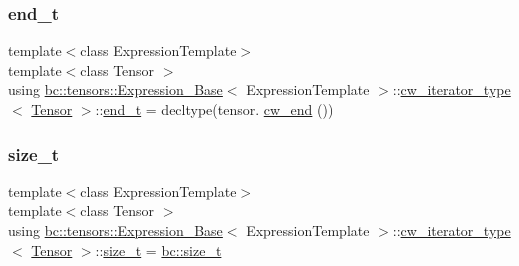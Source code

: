 \mbox{\label{structbc_1_1tensors_1_1Expression__Base_1_1cw__iterator__type_aa4dec4d7233266282d8243b49a101174}} 
\subsubsection{\texorpdfstring{end\+\_\+t}{end\_t}}
{\footnotesize\ttfamily template$<$class Expression\+Template$>$ \\
template$<$class Tensor $>$ \\
using \hyperlink{classbc_1_1tensors_1_1Expression__Base}{bc\+::tensors\+::\+Expression\+\_\+\+Base}$<$ Expression\+Template $>$\+::\hyperlink{structbc_1_1tensors_1_1Expression__Base_1_1cw__iterator__type}{cw\+\_\+iterator\+\_\+type}$<$ \hyperlink{namespacebc_a659391e47ab612be3ba6c18cf9c89159}{Tensor} $>$\+::\hyperlink{structbc_1_1tensors_1_1Expression__Base_1_1cw__iterator__type_aa4dec4d7233266282d8243b49a101174}{end\+\_\+t} =  decltype(tensor. \hyperlink{classbc_1_1tensors_1_1Expression__Base_a4ca9ee5e831fdfa6575e34071927cc1e}{cw\+\_\+end} ())}

\mbox{\label{structbc_1_1tensors_1_1Expression__Base_1_1cw__iterator__type_a1423458dda5ab2bd7c7ade4f69fbf081}} 
\subsubsection{\texorpdfstring{size\+\_\+t}{size\_t}}
{\footnotesize\ttfamily template$<$class Expression\+Template$>$ \\
template$<$class Tensor $>$ \\
using \hyperlink{classbc_1_1tensors_1_1Expression__Base}{bc\+::tensors\+::\+Expression\+\_\+\+Base}$<$ Expression\+Template $>$\+::\hyperlink{structbc_1_1tensors_1_1Expression__Base_1_1cw__iterator__type}{cw\+\_\+iterator\+\_\+type}$<$ \hyperlink{namespacebc_a659391e47ab612be3ba6c18cf9c89159}{Tensor} $>$\+::\hyperlink{structbc_1_1tensors_1_1Expression__Base_1_1cw__iterator__type_a1423458dda5ab2bd7c7ade4f69fbf081}{size\+\_\+t} =  \hyperlink{namespacebc_aaf8e3fbf99b04b1b57c4f80c6f55d3c5}{bc\+::size\+\_\+t}}



